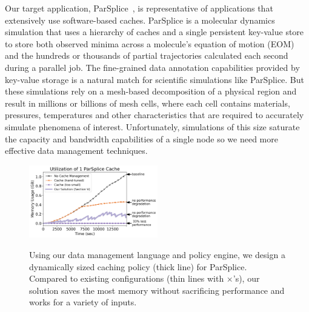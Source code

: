 Our target application, ParSplice~\cite{perez:jctc20150parsplice}, is
representative of applications that extensively use software-based caches.
ParSplice is a molecular dynamics simulation that uses a hierarchy of caches
and a single persistent key-value store to store both observed minima across a
molecule's equation of motion (EOM) and the hundreds or thousands of partial
trajectories calculated each second during a parallel job.  The fine-grained
data annotation capabilities provided by key-value storage is a natural match
for scientific simulations like ParSplice. But these simulations rely on a
mesh-based decomposition of a physical region and result in millions or
billions of mesh cells, where each cell contains materials, pressures,
temperatures and other characteristics that are required to accurately simulate
phenomena of interest.  Unfortunately, simulations of this size saturate the
capacity and bandwidth capabilities of a single node so we need more effective
data management techniques.

\begin{figure}[t]
\noindent\includegraphics[width=0.5\textwidth]{figures/cache-management.png}\\
\caption{Using our data management language and policy engine, we design a
dynamically sized caching policy (thick line) for ParSplice.  Compared to
existing configurations (thin lines with \(\times\)'s), our solution saves the most
memory without sacrificing performance and works for a variety of inputs.
\label{fig:cache-management}}
\end{figure}

